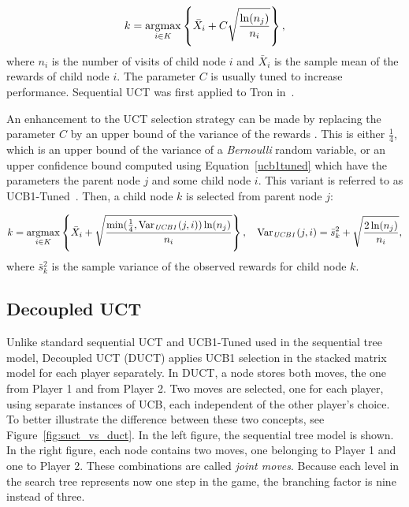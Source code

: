 \documentclass{article}
\newcommand{\argmax}{\operatornamewithlimits{argmax}}
\begin{document}
\begin{equation}\label{uct}
  k = \argmax_{i \in K} \left\{ \bar{X}_{i} + C \sqrt{\frac{\ln (n_{j})}{n_{i}}} \right\},
\end{equation}
where $n_{i}$ is the number of visits of child node $i$ and $\bar{X}_{i}$ is the sample mean of the rewards of child node $i$. 
The parameter $C$ is usually tuned to increase performance. Sequential UCT was first applied to Tron in~\cite{tron_cig}.


An enhancement to the UCT selection strategy can be made by replacing the parameter $C$ by an upper bound of the variance of the rewards \cite{cig_paper}. This is either $\frac{1}{4}$, which is an upper bound of the variance of a \emph{Bernoulli} random variable, or an upper confidence bound computed using Equation~\ref{ucb1tuned} which have the parameters the parent node $j$ and some child node $i$.
This variant is referred to as UCB1-Tuned~\cite{auer_et_al}.
Then, a child node $k$ is selected from parent node $j$:

\begin{equation}\label{ucb1tuned}
k = \argmax_{i \in K} \left\{ \bar{X}_{i} + \sqrt{\frac{\min(\frac{1}{4},\mathrm{Var}_{\mathit{UCB1}}(j,i)) \ln (n_{j})}{n_{i}}} \right\}, 
\mbox{ \hspace{0.1cm} } 
\mbox{Var}_{\mathit{UCB1}}(j,i)=\bar{s} ^2_{k}+\sqrt{\frac{2 \ln (n_{j})}{n_{i}}},
\end{equation}
where $\bar{s} ^2_{k}$ is the sample variance of the observed rewards for child node $k$. 


\subsection{Decoupled UCT}
\label{subsec:duct}

Unlike standard sequential UCT and UCB1-Tuned used in the sequential tree model, 
Decoupled UCT (DUCT) applies UCB1 selection in the stacked matrix model for each player separately.
In DUCT, a node stores both moves, the one from Player 1 and from Player 2. 
Two moves are selected, one for each player, using separate instances of UCB, each independent of the other player's choice.  
To better illustrate the difference between these two concepts, see Figure~\ref{fig:suct_vs_duct}. In the left figure, the sequential tree model is shown. In the right figure, each node contains two moves, one belonging to Player 1 and one to Player 2. These combinations are called {\it joint moves}. Because each level in the search tree represents now one step in the game, the branching factor is nine instead of three.
\end{document}
